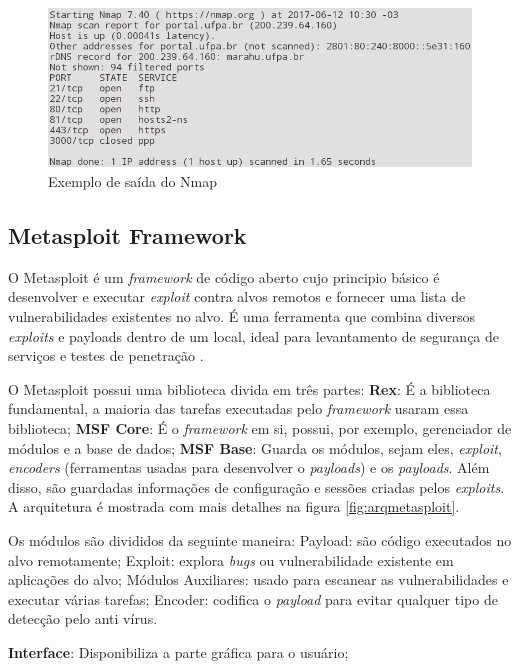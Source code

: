 \documentclass[
	12pt,				
	openright,		
	twoside,	
	a4paper,
	english,	
	brazil	
	]{abntex2}
\begin{document}
 \begin{figure}[!htb]
  \centering
  \includegraphics[scale=.5]{nmap.png}
  \caption{Exemplo de saída do Nmap}
  \label{fig:nmap}
 \end{figure}

 \subsection{Metasploit Framework} \label{sec:metasploit}

 O Metasploit é um \textit{framework} de código aberto cujo principio básico é desenvolver e executar \textit{exploit} contra alvos remotos e fornecer uma lista de vulnerabilidades existentes no alvo. É uma ferramenta que combina diversos \textit{exploits} e payloads dentro de um local, ideal para levantamento de segurança de serviços e testes de penetração \cite{metasploit:yash}.  

 O Metasploit possui uma biblioteca divida em três partes: \textbf{Rex}: É a biblioteca fundamental, a maioria das tarefas executadas pelo \textit{framework} usaram essa biblioteca; \textbf{MSF Core}: É o \textit{framework} em si, possui, por exemplo, gerenciador de módulos e a base de dados; \textbf{MSF Base}: Guarda os módulos, sejam eles, \textit{exploit}, \textit{encoders} (ferramentas usadas para desenvolver o \textit{payloads}) e os \textit{payloads}. Além disso, são guardadas informações de configuração e sessões criadas pelos \textit{exploits}. A arquitetura é mostrada com mais detalhes na figura \ref{fig:arqmetasploit}. 

 Os módulos são divididos da seguinte maneira: Payload: são código executados no alvo remotamente; Exploit: explora \textit{bugs} ou vulnerabilidade existente em aplicações do alvo; Módulos Auxiliares: usado para escanear as vulnerabilidades e executar várias tarefas; Encoder: codifica o \textit{payload} para evitar qualquer tipo de detecção pelo anti vírus.

 \textbf{Interface}: Disponibiliza a parte gráfica para o usuário;
\end{document}
